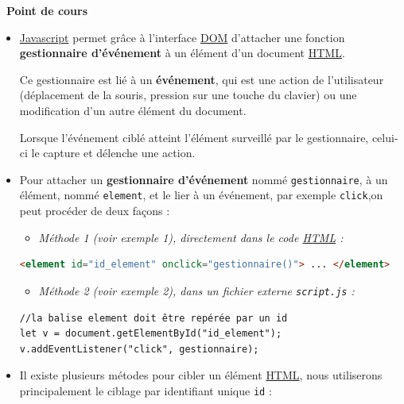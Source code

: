 \documentclass[
  11pt,
]{article}
\newcommand{\passthrough}[1]{#1}
\providecommand{\tightlist}{%
  \setlength{\itemsep}{0pt}\setlength{\parskip}{0pt}}
\newcounter{cours}
\newenvironment{cours}[1]
{\par \medskip   \addtocounter{cours}{1} \noindent  
\begin{bclogo}[arrondi =0.1,  ombre = true, barre=none, logo=\bcbook, marge=4]{~\textbf{Point de cours} \textbf{\thecours} {\itshape #1} }  \par}
{
\end{bclogo}
 \par \bigskip }
\begin{document}
\begin{cours}{}

\begin{itemize}
\item
  \href{https://developer.mozilla.org/fr/docs/Glossaire/JavaScript}{Javascript}
  permet grâce à l'interface
  \href{https://developer.mozilla.org/fr/docs/Glossaire/DOM}{DOM}
  d'attacher une fonction \textbf{gestionnaire d'événement} à un élément
  d'un document
  \href{https://developer.mozilla.org/fr/docs/Glossaire/HTML}{HTML}.

  Ce gestionnaire est lié à un \textbf{événement}, qui est une action de
  l'utilisateur (déplacement de la souris, pression sur une touche du
  clavier) ou une modification d'un autre élément du document.

  Lorsque l'événement ciblé atteint l'élément surveillé par le
  gestionnaire, celui-ci le capture et délenche une action.
\item
  Pour attacher un \textbf{gestionnaire d'événement} nommé
  \passthrough{\lstinline!gestionnaire!}, à un élément, nommé
  \passthrough{\lstinline!element!}, et le lier à un événement, par
  exemple \passthrough{\lstinline!click!},on peut procéder de deux
  façons :

  \begin{itemize}
  \tightlist
  \item
    \emph{Méthode 1 (voir exemple 1), directement dans le code
    \href{https://developer.mozilla.org/fr/docs/Glossaire/HTML}{HTML} :}
  \end{itemize}

\begin{lstlisting}[language=HTML]
<element id="id_element" onclick="gestionnaire()"> ... </element>
\end{lstlisting}

  \begin{itemize}
  \tightlist
  \item
    \emph{Méthode 2 (voir exemple 2), dans un fichier externe
    \passthrough{\lstinline!script.js!} :}
  \end{itemize}

\begin{lstlisting}
//la balise element doit être repérée par un id 
let v = document.getElementById("id_element");
v.addEventListener("click", gestionnaire);
\end{lstlisting}
\item
  Il existe plusieurs métodes pour cibler un élément
  \href{https://developer.mozilla.org/fr/docs/Glossaire/HTML}{HTML},
  nous utiliserons principalement le ciblage par identifiant unique
  \passthrough{\lstinline!id!} :
\end{itemize}


\end{cours}
\end{document}
